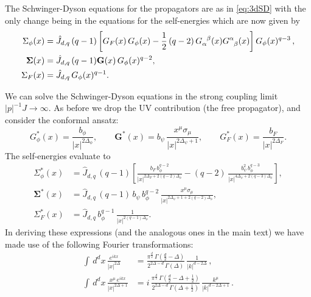 \documentclass[11pt]{article}
\begin{document}
The Schwinger-Dyson equations for the propagators are as in \eqref{eq:3dSD} with the only change being in the equations for the self-energies which are now given by 
%
\begin{equation}\label{eq:Sigmadq}
\begin{split}
\Sigma_\phi(x)
& 
	= \hat{J}_{d,q}\, (q-1)
	 \left[G_F(x)\, G_\phi(x) 
	 - \frac{1}{2} \, (q-2)\,G\indices{_\alpha^\beta}(x) G\indices{^\alpha_\beta}(x) \right] G_\phi(x)^{q-3}\,,\\
\bm{\Sigma}(x)
& =
	\hat{J}_{d,q} \, (q-1) \mathbf{G}(x)\, G_\phi(x)^{q-2}, \\
\Sigma_F(x) 
& = 
	\hat{J}_{d,q} \, G_\phi(x)^{q-1}.
\end{split}
\end{equation}
%


We can solve the Schwinger-Dyson equations in the strong coupling limit $|p|^{-1} J\to\infty$. As before we drop the UV contribution (the free propagator), and consider the conformal ansatz:
%
\begin{equation}
G^*_\phi(x)
	= \frac{b_\phi }{ |x|^{2\Delta_\phi}},
\qquad  
\mathbf{G}^*(x)
	= b_\psi \, \frac{x^\mu\sigma_\mu}{ |x|^{2\Delta_\psi+1}},
\qquad 
G^*_F(x)= \frac{b_F}{ |x|^{2\Delta_F}}.
\end{equation}	
%
The self-energies evaluate to
%
\begin{equation}
\begin{split}
\Sigma^*_\phi(x)
&=
	 \hat{J}_{d,q} \, (q-1) \left[\frac{b_F\, b_\phi^{q-2}}{ |x|^{2\Delta_F+2(q-2)\Delta_\phi}} -
	(q-2) \, \frac{b_\psi^2\, b_\phi^{q-3}}{ |x|^{4\Delta_\psi+2(q-3)\Delta_\phi}}\right], \\
\bm{\Sigma}^*(x)
&=
	\hat{J}_{d,q}\, (q-1) \, b_\psi\, b_\phi^{q-2} \, \frac{x^\mu\sigma_\mu}{ |x|^{2\Delta_\psi+1+2(q-2)\Delta_\phi}},\\
\Sigma^*_F(x)
&=
	\hat{J}_{d,q}\,  b_\phi^{q-1} \, \frac{1}{ |x|^{2(q-1)\Delta_\phi}}.
\end{split}
\end{equation}
%
In deriving these expressions (and the analogous ones in the main text) we have made use of the following Fourier transformations:
%
\begin{equation}\label{eq:propFT}
\begin{split}
\int\, d^dx\, \frac{e^{ikx}}{|x|^{2\Delta}} 
&= 
	\frac{\pi^\frac{d}{2}\, \Gamma(\frac{d}{2}-\Delta)}{2^{2\Delta-d}\, \Gamma(\Delta)} \, \frac{1}{|k|^{d-2\Delta}} \,, \\
\int\, d^dx\, \frac{x^\mu \, e^{ikx}}{|x|^{2\Delta+1}} 
&= 
	i\, \frac{\pi^\frac{d}{2}\, \Gamma(\frac{d}{2}-\Delta + \frac{1}{2})}{2^{2\Delta-d}\, \Gamma(\Delta+\frac{1}{2})} \, \frac{k^\mu}{|k|^{d-2\Delta+1}} \,.	
\end{split}
\end{equation}	
\end{document}
